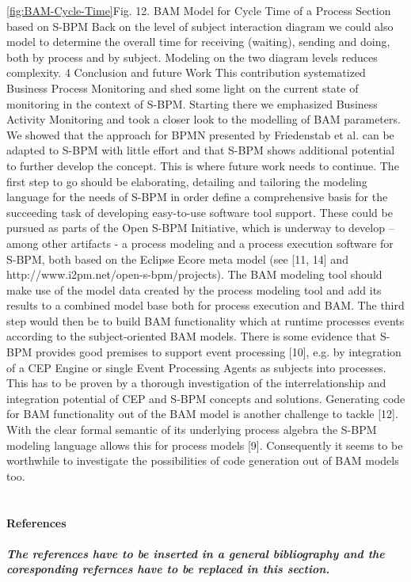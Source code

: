\ref{fig:BAM-Cycle-Time}Fig. 12. BAM Model for Cycle Time of a Process Section based on S-BPM
Back on the level of subject interaction diagram we could also model to determine the overall time for receiving (waiting), sending and doing, both by process and by subject. Modeling on the two diagram levels reduces complexity.
4   Conclusion and future Work
This contribution systematized Business Process Monitoring and shed some light on the current state of monitoring in the context of S-BPM. Starting there we emphasized Business Activity Monitoring and took a closer look to the modelling of BAM parameters. We showed that the approach for BPMN presented by Friedenstab et al. can be adapted to S-BPM with little effort and that S-BPM shows additional potential to further develop the concept.
This is where future work needs to continue. The first step to go should be elaborating, detailing and tailoring the modeling language for the needs of S-BPM in order define a comprehensive basis for the succeeding task of developing easy-to-use software tool support. These could be pursued as parts of the Open S-BPM Initiative, which is underway to develop – among other artifacts - a process modeling and a process execution software for S-BPM, both based on the Eclipse Ecore meta model (see [11, 14] and http://www.i2pm.net/open-s-bpm/projects). The BAM modeling tool should make use of the model data created by the process modeling tool and add its results to a combined model base both for process execution and BAM. The third step would then be to build BAM functionality which at runtime processes events according to the subject-oriented BAM models. There is some evidence that S-BPM provides good premises to support event processing [10], e.g. by integration of a CEP Engine or single Event Processing Agents as subjects into processes. This has to be proven by a thorough investigation of the interrelationship and integration potential of CEP and S-BPM concepts and solutions. Generating code for BAM functionality out of the BAM model is another challenge to tackle [12]. With the clear formal semantic of its underlying process algebra the S-BPM modeling language allows this for process models [9]. Consequently it seems to be worthwhile to investigate the possibilities of code generation out of BAM models too. 
\\
\\
\\
\textbf{References}\\
\\
\textbf{\textit{The references have to be inserted in a general bibliography and the coresponding refernces have to be replaced in this section.}}\\
